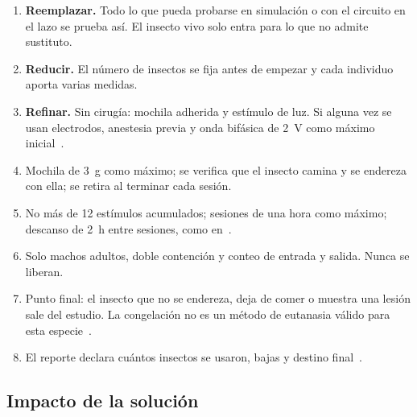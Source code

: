 \begin{enumerate}
  \item \textbf{Reemplazar.} Todo lo que pueda probarse en simulación o con el circuito en el lazo se prueba
        así. El insecto vivo solo entra para lo que no admite sustituto.
  \item \textbf{Reducir.} El número de insectos se fija antes de empezar y cada individuo aporta varias medidas.
  \item \textbf{Refinar.} Sin cirugía: mochila adherida y estímulo de luz. Si alguna vez se usan electrodos,
        anestesia previa y onda bifásica de 2~V como máximo inicial~\cite{erickson2015}.
  \item Mochila de 3~g como máximo; se verifica que el insecto camina y se endereza con ella; se retira al
        terminar cada sesión.
  \item No más de 12 estímulos acumulados; sesiones de una hora como máximo; descanso de 2~h entre
        sesiones, como en~\cite{gracidas2026}.
  \item Solo machos adultos, doble contención y conteo de entrada y salida. Nunca se liberan.
  \item Punto final: el insecto que no se endereza, deja de comer o muestra una lesión sale del estudio.
        La congelación no es un método de eutanasia válido para esta especie~\cite{tucker2023}.
  \item El reporte declara cuántos insectos se usaron, bajas y destino final~\cite{fischer2024}.
\end{enumerate}

\subsection{Impacto de la solución}


